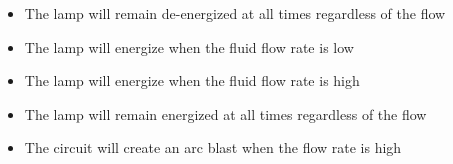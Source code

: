 \begin{itemize}
\item{} The lamp will remain de-energized at all times regardless of the flow 
\vskip 5pt 
\item{} The lamp will energize when the fluid flow rate is low
\vskip 5pt 
\item{} The lamp will energize when the fluid flow rate is high
\vskip 5pt 
\item{} The lamp will remain energized at all times regardless of the flow 
\vskip 5pt 
\item{} The circuit will create an arc blast when the flow rate is high
\end{itemize}




